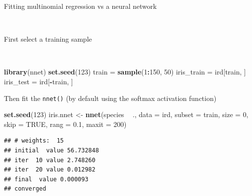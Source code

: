 \documentclass[10pt,ignorenonframetext,]{beamer}
\newenvironment{Shaded}{\begin{snugshade}}{\end{snugshade}}
\newcommand{\DataTypeTok}[1]{\textcolor[rgb]{0.13,0.29,0.53}{#1}}
\newcommand{\DecValTok}[1]{\textcolor[rgb]{0.00,0.00,0.81}{#1}}
\newcommand{\FloatTok}[1]{\textcolor[rgb]{0.00,0.00,0.81}{#1}}
\newcommand{\KeywordTok}[1]{\textcolor[rgb]{0.13,0.29,0.53}{\textbf{#1}}}
\newcommand{\NormalTok}[1]{#1}
\newcommand{\OperatorTok}[1]{\textcolor[rgb]{0.81,0.36,0.00}{\textbf{#1}}}
\newcommand{\OtherTok}[1]{\textcolor[rgb]{0.56,0.35,0.01}{#1}}
\newcommand{\StringTok}[1]{\textcolor[rgb]{0.31,0.60,0.02}{#1}}
\begin{document}
\begin{frame}[fragile]

\begin{block}{Fitting multinomial regression vs a neural network}

\(~\)

First select a training sample

\scriptsize

\(~\)

\begin{Shaded}
\begin{Highlighting}[]
\KeywordTok{library}\NormalTok{(nnet)}
\KeywordTok{set.seed}\NormalTok{(}\DecValTok{123}\NormalTok{)}
\NormalTok{train =}\StringTok{ }\KeywordTok{sample}\NormalTok{(}\DecValTok{1}\OperatorTok{:}\DecValTok{150}\NormalTok{, }\DecValTok{50}\NormalTok{)}
\NormalTok{iris_train =}\StringTok{ }\NormalTok{ird[train, ]}
\NormalTok{iris_test =}\StringTok{ }\NormalTok{ird[}\OperatorTok{-}\NormalTok{train, ]}
\end{Highlighting}
\end{Shaded}

\normalsize

Then fit the \texttt{nnet()} (by default using the softmax activation
function)

\scriptsize

\begin{Shaded}
\begin{Highlighting}[]
\KeywordTok{set.seed}\NormalTok{(}\DecValTok{123}\NormalTok{)}
\NormalTok{iris.nnet <-}\StringTok{ }\KeywordTok{nnet}\NormalTok{(species }\OperatorTok{~}\StringTok{ }\NormalTok{., }\DataTypeTok{data =}\NormalTok{ ird, }\DataTypeTok{subset =}\NormalTok{ train, }\DataTypeTok{size =} \DecValTok{0}\NormalTok{, }
    \DataTypeTok{skip =} \OtherTok{TRUE}\NormalTok{, }\DataTypeTok{rang =} \FloatTok{0.1}\NormalTok{, }\DataTypeTok{maxit =} \DecValTok{200}\NormalTok{)}
\end{Highlighting}
\end{Shaded}

\begin{verbatim}
## # weights:  15
## initial  value 56.732848 
## iter  10 value 2.748260
## iter  20 value 0.012982
## final  value 0.000093 
## converged
\end{verbatim}

\end{block}

\end{frame}
\end{document}
